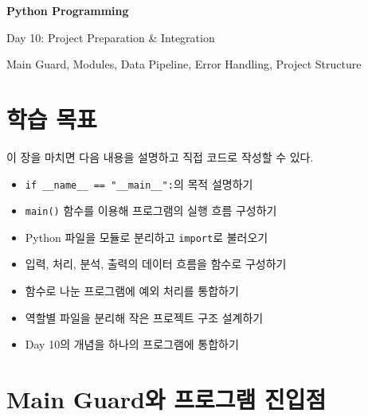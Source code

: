 \documentclass[11pt,a4paper]{article}
\begin{document}
\begin{titlepage}
    \centering
    \vspace*{3cm}

    {\Huge\bfseries Python Programming\par}
    \vspace{0.8cm}
    {\LARGE Day 10: Project Preparation \& Integration\par}

    \vspace{2cm}

    {\large Main Guard, Modules, Data Pipeline, Error Handling, Project Structure\par}

    \vfill
\end{titlepage}

\tableofcontents
\newpage

\section{학습 목표}

\begin{learningbox}
이 장을 마치면 다음 내용을 설명하고 직접 코드로 작성할 수 있다.
\begin{itemize}[leftmargin=1.5em]
    \item \texttt{if \_\_name\_\_ == "\_\_main\_\_":}의 목적 설명하기
    \item \texttt{main()} 함수를 이용해 프로그램의 실행 흐름 구성하기
    \item Python 파일을 모듈로 분리하고 \texttt{import}로 불러오기
    \item 입력, 처리, 분석, 출력의 데이터 흐름을 함수로 구성하기
    \item 함수로 나눈 프로그램에 예외 처리를 통합하기
    \item 역할별 파일을 분리해 작은 프로젝트 구조 설계하기
    \item Day 10의 개념을 하나의 프로그램에 통합하기
\end{itemize}
\end{learningbox}

\section{Main Guard와 프로그램 진입점}
\end{document}
